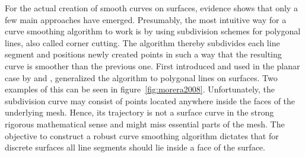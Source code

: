 \documentclass{stdlocal}
\begin{document}
For the actual creation of smooth curves on surfaces, evidence shows that only a few main approaches have emerged.
Presumably, the most intuitive way for a curve smoothing algorithm to work is by using subdivision schemes for polygonal lines, also called corner cutting.
The algorithm thereby subdivides each line segment and positions newly created points in such a way that the resulting curve is smoother than the previous one.
First introduced and used in the planar case by \textcite{chaikin1974} and \textcite{dyn1992}, \textcite{morera2008} generalized the algorithm to polygonal lines on surfaces.
Two examples of this can be seen in figure~\ref{fig:morera2008}.
Unfortunately, the subdivision curve may consist of points located anywhere inside the faces of the underlying mesh.
Hence, its trajectory is not a surface curve in the strong rigorous mathematical sense and might miss essential parts of the mesh.
The objective to construct a robust curve smoothing algorithm dictates that for discrete surfaces all line segments should lie inside a face of the surface.
\end{document}
